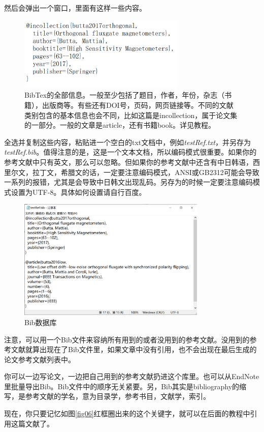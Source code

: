然后会弹出一个窗口，里面有这样一些内容。
\begin{figure}[H]
\label{fig04}
\centering
\includegraphics[width=8cm]{PICS/Cite4.png}
\caption{BibTex的全部信息。一般至少包括了题目，作者，年份，杂志（书籍），出版商等。有些还有DOI号，页码，网页链接等。不同的文献类别包含的基本信息也会不同，比如这篇是incollection，属于论文集的一部分。一般的文章是article，还有书籍book。详见教程。}
\end{figure}\par
全选并复制这些内容，粘贴进一个空白的txt文档中，例如\textit{testRef.txt}，并另存为\textit{testRef.bib}。值得注意的是，这是一个文本文档，所以编码模式很重要。如果你的参考文献中只有英文，那么可以忽略。但如果你的参考文献中还含有中日韩语，西里尔文，拉丁文，希腊文的话，一定要注意编码模式，ANSI或GB2312可能会导致一系列的报错，尤其是会导致中日韩文出现乱码。另存为的时候一定要注意编码模式设置为UTF-8。具体如何设置请自行百度。
\begin{figure}[H]
\label{fig05}
\centering
\includegraphics[width=9cm]{PICS/Cite5.png}
\caption{Bib数据库}
\end{figure}\par
注意，可以用一个Bib文件来容纳所有用到的或者没用到的参考文献。没用到的参考文献就算出现在了Bib文件里，如果文章中没有引用，也不会出现在最后生成的论文参考文献列表中。\par
你可以一边写论文，一边把自己用到的参考文献扔进这个库里。也可以从EndNote里批量导出Bib。Bib文件中的顺序无关紧要。另，Bib其实是bibliography的缩写，是参考文献的学名，意为目录学，参考书目，文献学，索引。\par
现在，你只要记忆如图\ref{fig06}红框圈出来的这个关键字，就可以在后面的教程中引用这篇文献了。\par
